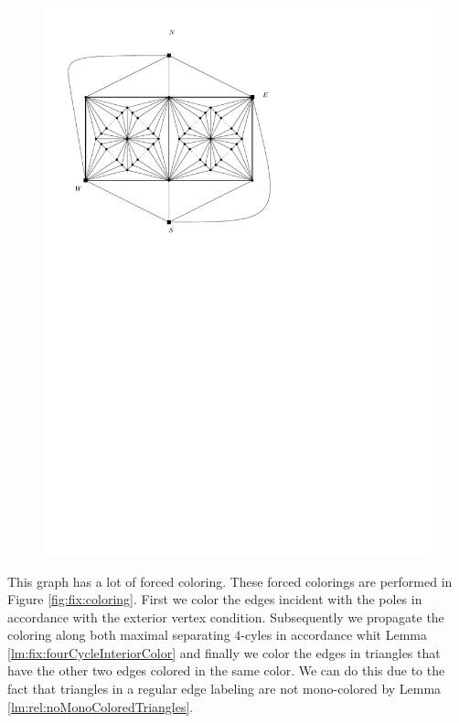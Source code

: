   \begin{figure}[h]
    \centering
    \includegraphics[scale=1]{fixExtension/img/manymanybase}
    \caption{}
    \label{fig:fix:manymany0}
  \end{figure}

  This graph has a lot of forced coloring. These forced colorings are performed in Figure \ref{fig:fix:coloring}. First we color the edges incident with the poles in accordance with the exterior vertex condition. Subsequently we propagate the coloring along both maximal separating $4$-cyles in accordance whit Lemma \ref{lm:fix:fourCycleInteriorColor} and finally we color the edges in triangles that have the other two edges colored in the same color. We can do this due to the fact that triangles in a regular edge labeling are not mono-colored by Lemma \ref{lm:rel:noMonoColoredTriangles}.


